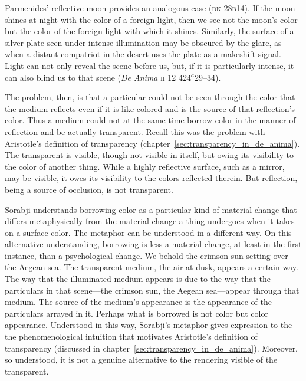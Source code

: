 Parmenides' reflective moon provides an analogous case (\textsc{dk} 28\textsc{b}14). If the moon shines at night with the color of a foreign light, then we see not the moon's color but the color of the foreign light with which it shines. Similarly, the surface of a silver plate seen under intense illumination may be obscured by the glare, as when a distant compatriot in the desert uses the plate as a makeshift signal. Light can not only reveal the scene before us, but, if it is particularly intense, it can also blind us to that scene (\emph{De Anima} \textsc{ii} 12 424\( ^{a} \)29--34).

The problem, then, is that a particular could not be seen through the color that the medium reflects even if it is like-colored and is the source of that reflection's color. Thus a medium could not at the same time borrow color in the manner of reflection and be actually transparent. Recall this was the problem with Aristotle's definition of transparency (chapter~\ref{sec:transparency_in_de_anima}). The transparent is visible, though not visible in itself, but owing its visibility to the color of another thing. While a highly reflective surface, such as a mirror, may be visible, it owes its visibility to the colors reflected therein. But reflection, being a source of occlusion, is not transparent.

Sorabji understands borrowing color as a particular kind of material change that differs metaphysically from the material change a thing undergoes when it takes on a surface color. The metaphor can be understood in a different way. On this alternative understanding, borrowing is less a material change, at least in the first instance, than a psychological change. We behold the crimson sun setting over the Aegean sea. The transparent medium, the air at dusk, appears a certain way. The way that the illuminated medium appears is due to the way that the particulars in that scene---the crimson sun, the Aegean sea---appear through that medium. The source of the medium's appearance is the appearance of the particulars arrayed in it. Perhaps what is borrowed is not color but color appearance. Understood in this way, Sorabji's metaphor gives expression to the the phenomenological intuition that motivates Aristotle's definition of transparency (discussed in chapter~\ref{sec:transparency_in_de_anima}). Moreover, so understood, it is not a genuine alternative to the rendering visible of the transparent.

